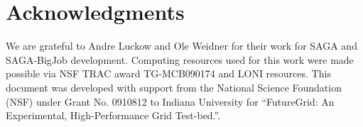 \documentclass{sig-alternate}
\begin{document}
\section{Acknowledgments}
We are grateful to Andre Luckow and Ole Weidner for their work for
SAGA and SAGA-BigJob development.  Computing resources used for this
work were made possible via NSF TRAC award TG-MCB090174 and LONI
resources.  This document was developed with support from the National
Science Foundation (NSF) under Grant No.  0910812 to Indiana
University for ``FutureGrid: An Experimental, High-Performance Grid
Test-bed.''.



\end{document}
